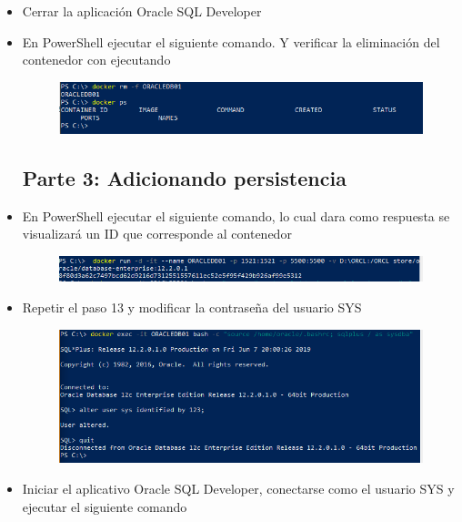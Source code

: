 \begin{itemize}
	\item Cerrar la aplicación Oracle SQL Developer
	\item En PowerShell ejecutar el siguiente comando. Y verificar la eliminación del contenedor con ejecutando
		\begin{figure}[H]
		\begin{center}
		\includegraphics[width=12cm]{./Imagenes/15}
		\end{center}
		\end{figure}


\subsection{Parte 3: Adicionando persistencia}
	\item En PowerShell ejecutar el siguiente comando, lo cual dara como respuesta se visualizará un ID que corresponde al contenedor
		\begin{figure}[H]
		\begin{center}
		\includegraphics[width=12cm]{./Imagenes/16}
		\end{center}
		\end{figure}
	\item Repetir el paso 13 y modificar la contraseña del usuario SYS
		\begin{figure}[H]
		\begin{center}
		\includegraphics[width=12cm]{./Imagenes/20}
		\end{center}
		\end{figure}
       	\item Iniciar el aplicativo Oracle SQL Developer, conectarse como el usuario SYS y ejecutar el siguiente comando
		\begin{figure}[H]

\end{figure}
\end{itemize}
